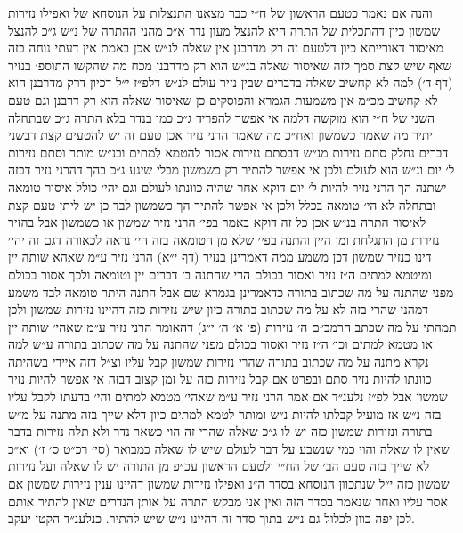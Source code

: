 \documentclass[12pt, openany]{book}
\begin{document}
\begin{multicols}{2}
והנה אם נאמר כטעם הראשון של ח״י כבר מצאנו התנצלות על הנוסחא של ואפילו נזירות שמשון כיון דהתכלית של התרה היא להנצל מעון נדר א״כ מהני ההתרה של נ״ש ג״כ להנצל מאיסור דאורייתא כיון דלטעם זה רק מדרבנן אין שאלה לנ״ש אכן באמת אין דעתי נוחה בזה שאף שיש קצת סמך לזה שאיסור שאלה בנ״ש הוא רק מדרבנן מכח מה שהקשו התוספ׳ בנזיר (דף ד׳) למה לא קחשיב שאלה בדברים שבין נזיר עולם לנ״ש דלפ״ז י״ל דכיון דרק מדרבנן הוא לא קחשיב מכ״מ אין משמעות הגמרא והפוסקים כן שאיסור שאלה הוא רק דרבנן וגם טעם השני של ח״י הוא מוקשה דלמה אי אפשר להפריד ג״כ כמו בנדר בלא התרה ג״כ שבתחלה יתיר מה שאמר כשמשון ואח״כ מה שאמר הרני נזיר אכן טעם זה יש להטעים קצת דבשני דברים נחלק סתם נזירות מנ״ש דבסתם נזירות אסור להטמא למתים ובנ״ש מותר וסתם נזירות ל׳ יום ונ״ש הוא לעולם ולכן אי אפשר להתיר רק כשמשון מבלי שיגע ג״כ בהך דהרני נזיר דבזה ישתנה הך הרני נזיר להיות ל׳ יום דוקא אחר שהיה כוונתו לעולם וגם יהי׳ כולל איסור טומאה ובתחלה לא הי׳ טומאה בכלל ולכן אי אפשר להתיר הך כשמשון לבד כן יש ליתן טעם קצת לאיסור התרה בנ״ש אכן כל זה דוקא באמר בפי׳ הרני נזיר שמשון או כשמשון אבל בהזיר נזירות מן התגלחת ומן היין והתנה בפי׳ שלא מן הטומאה בזה הי׳ נראה לכאורה דגם זה יהי׳ דינו כנזיר שמשון דכן משמע ממה דאמרינן בנזיר (דף י״א) הרני נזיר ע״מ שאהא שותה יין ומיטמא למתים ה״ז נזיר ואסור בכולם הרי שהתנה ב׳ דברים יין וטומאה ולכך אסור בכולם מפני שהתנה על מה שכתוב בתורה כדאמרינן בגמרא שם אבל התנה היתר טומאה לבד משמע דמהני שהרי בזה לא על מה שכתוב בתורה כיון שיש נזירות כזה דהיינו נזירות שמשון ולכן תמהתי על מה שכתב הרמב״ם ה׳ נזירות (פ׳ א׳ ה׳ י״ג) דהאומר הרני נזיר ע״מ שאהי׳ שותה יין או מטמא למתים וכו׳ ה״ז נזיר ואסור בכולם מפני שהתנה על מה שכתוב בתורה ע״ש למה נקרא מתנה על מה שכתוב בתורה שהרי נזירות שמשון קבל עליו וצ״ל דזה איירי בשהיתה כוונתו להיות נזיר סתם ובפרט אם קבל נזירות כזה על זמן קצוב דבזה אי אפשר להיות נזיר שמשון אבל לפ״ז נלענ״ד אם אמר הרני נזיר ע״מ שאהי׳ מטמא למתים והי׳ בדעתו לקבל עליו בזה נ״ש אז מועיל קבלתו להיות נ״ש ומותר לטמא למתים כיון דלא שייך בזה מתנה על מ״ש בתורה ונזירות שמשון כזה יש לו ג״כ שאלה שהרי זה הוי כשאר נדר ולא תלה נזירות בדבר שאין לו שאלה והוי כמי שנשבע על דבר לעולם שיש לו שאלה כמבואר (סי׳ רכ״ט ס׳ ז׳) וא״כ לא שייך בזה טעם הב׳ של הח״י ולטעם הראשון עכ״פ מן התורה יש לו שאלה ועל נזירות שמשון כזה י״ל שנתכוון הנוסחא בסדר ה״נ ואפילו נזירות שמשון דהיינו ענין נזירות שמשון אם אסר עליו ואחר שנאמר בסדר הזה ואין אני מבקש התרה על אותן הנדרים שאין להתיר אותם לכן יפה כוון לכלול גם נ״ש בתוך סדר זה דהיינו נ״ש שיש להתיר. כנלענ״ד הקטן יעקב.\\\vspace{0pt}

\end{multicols}\newpage
\end{document}
